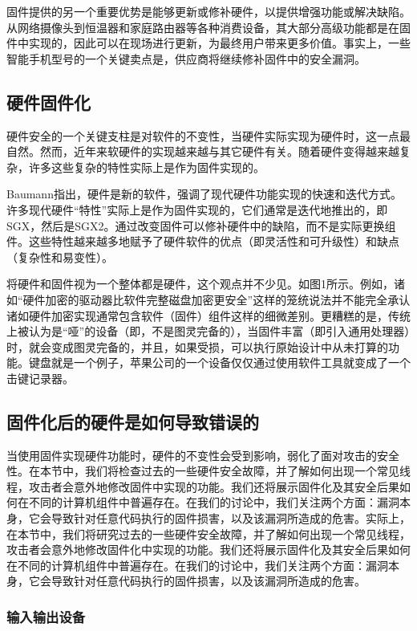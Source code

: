 固件提供的另一个重要优势是能够更新或修补硬件，以提供增强功能或解决缺陷。从网络摄像头到恒温器和家庭路由器等各种消费设备，其大部分高级功能都是在固件中实现的，因此可以在现场进行更新，为最终用户带来更多价值。事实上，一些智能手机型号的一个关键卖点是，供应商将继续修补固件中的安全漏洞。

\subsection{硬件固件化}

硬件安全的一个关键支柱是对软件的不变性，当硬件实际实现为硬件时，这一点最自然。然而，近年来软硬件的实现越来越与其它硬件有关。随着硬件变得越来越复杂，许多这些复杂的特性实际上是作为固件实现的。

Baumann指出，硬件是新的软件，强调了现代硬件功能实现的快速和迭代方式。许多现代硬件“特性”实际上是作为固件实现的，它们通常是迭代地推出的，即SGX，然后是SGX2。通过改变固件可以修补硬件中的缺陷，而不是实际更换组件。这些特性越来越多地赋予了硬件软件的优点（即灵活性和可升级性）和缺点（复杂性和易变性）。

将硬件和固件视为一个整体都是硬件，这个观点并不少见。如图1所示。例如，诸如“硬件加密的驱动器比软件完整磁盘加密更安全”这样的笼统说法并不能完全承认诸如硬件加密实现通常包含软件（固件）组件这样的细微差别。更糟糕的是，传统上被认为是“哑”的设备（即，不是图灵完备的），当固件丰富（即引入通用处理器）时，就会变成图灵完备的，并且，如果受损，可以执行原始设计中从未打算的功能。键盘就是一个例子，苹果公司的一个设备仅仅通过使用软件工具就变成了一个击键记录器。

\subsection{固件化后的硬件是如何导致错误的}

当使用固件实现硬件功能时，硬件的不变性会受到影响，弱化了面对攻击的安全性。在本节中，我们将检查过去的一些硬件安全故障，并了解如何出现一个常见线程，攻击者会意外地修改固件中实现的功能。我们还将展示固件化及其安全后果如何在不同的计算机组件中普遍存在。在我们的讨论中，我们关注两个方面：漏洞本身，它会导致针对任意代码执行的固件损害，以及该漏洞所造成的危害。实际上，在本节中，我们将研究过去的一些硬件安全故障，并了解如何出现一个常见线程，攻击者会意外地修改固件化中实现的功能。我们还将展示固件化及其安全后果如何在不同的计算机组件中普遍存在。在我们的讨论中，我们关注两个方面：漏洞本身，它会导致针对任意代码执行的固件损害，以及该漏洞所造成的危害。

\subsubsection{输入输出设备}

